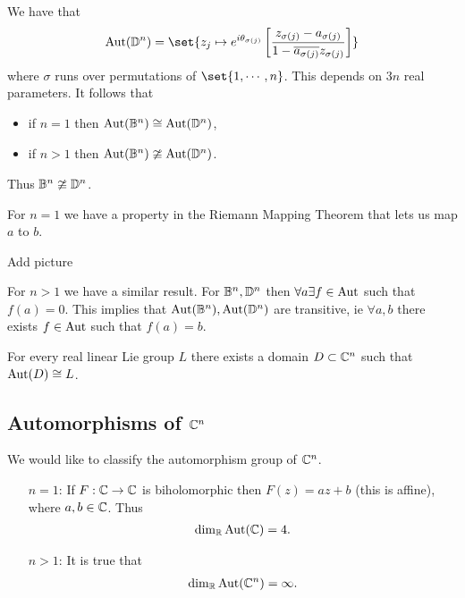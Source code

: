 \begin{remark}
    We have that
    \begin{align*}
        \Aut(\DD^n) = \set{ z_j \mapsto e^{i \theta_{\sigma(j)}} \left[ \frac{z_{\sigma(j)} - a_{\sigma(j)}}{1 - \overline{a_{\sigma(j)}} z_{\sigma(j)} } \right] }
    \end{align*}
    where $\sigma$ runs over permutations of $\set{1, \cdots, n}$. This depends on $3n$ real parameters. It follows that
    \begin{itemize}
        \item if $n=1$ then $\Aut(\ball^n) \cong \Aut(\DD^n)$,
        \item if $n>1$ then $\Aut(\ball^n) \ncong \Aut(\DD^n)$.
    \end{itemize}
    Thus $\ball^n \ncong \DD^n$.
\end{remark}

\begin{remark}
    For $n=1$ we have a property in the Riemann Mapping Theorem that lets us map $a$ to $b$.

    Add picture

    For $n>1$ we have a similar result. For $\ball^n, \DD^n$ then $\forall a \exists f \in \operatorname{Aut}$ such that $f(a) = 0$. This implies that $\Aut(\ball^n) , \Aut(\DD^n)$ are transitive, ie $\forall a,b $ there exists $f \in \operatorname{Aut}$ such that $f(a) = b$.
\end{remark}

\begin{theorem}
    For every real linear Lie group $L$ there exists a domain $D \subset \mathbb{C}^n$ such that $\operatorname{Aut}(D) \cong L$.
\end{theorem}

\subsection{Automorphisms of $\mathbb{C}^n$}

We would like to classify the automorphism group of $\mathbb{C}^n$.
\begin{itemize}
    \item[$n=1$:] If $F : \mathbb{C} \to \mathbb{C}$ is biholomorphic then $F(z) = az+b$ (this is affine), where $a,b \in \mathbb{C}$. Thus
    \begin{align*}
        \dim_{\mathbb{R}} \operatorname{Aut}(\mathbb{C}) = 4.
    \end{align*}
    \item[$n>1$:] It is true that
    \begin{align*}
        \dim_{\mathbb{R}} \operatorname{Aut}(\mathbb{C}^n) = \infty.
    \end{align*}
\end{itemize}

